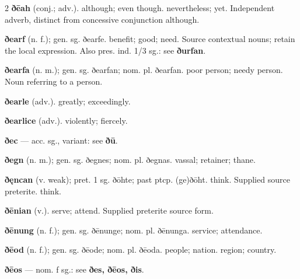 \begin{multicols*}{2}
\textbf{ðēah} (conj.; adv.). although; even though. nevertheless; yet. Independent adverb, distinct from concessive conjunction although.\par
\textbf{ðearf} (n. f.); gen. sg. ðearfe. benefit; good; need. Source contextual nouns; retain the local expression. Also pres. ind. 1/3 sg.: see \textbf{ðurfan}.\par
\textbf{ðearfa} (n. m.); gen. sg. ðearfan; nom. pl. ðearfan. poor person; needy person. Noun referring to a person.\par
\textbf{ðearle} (adv.). greatly; exceedingly.\par
\textbf{ðearlice} (adv.). violently; fiercely.\par
\textbf{ðec} — acc. sg., variant: see \textbf{ðū}.\par
\textbf{ðegn} (n. m.); gen. sg. ðegnes; nom. pl. ðegnas. vassal; retainer; thane.\par
\textbf{ðęncan} (v. weak); pret. 1 sg. ðōhte; past ptcp. (ge)ðōht. think. Supplied source preterite. think.\par
\textbf{ðēnian} (v.). serve; attend. Supplied preterite source form.\par
\textbf{ðēnung} (n. f.); gen. sg. ðēnunge; nom. pl. ðēnunga. service; attendance.\par
\textbf{ðēod} (n. f.); gen. sg. ðēode; nom. pl. ðēoda. people; nation. region; country.\par
\textbf{ðēos} — nom. f sg.: see \textbf{ðes, ðēos, ðis}.\par

\end{multicols*}
